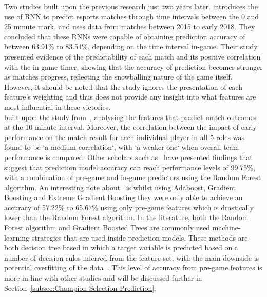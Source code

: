 Two studies built upon the previous research just two years later.
\citet{silva2018continuous} introduces the use of \ac{RNN} to predict esports matches through time intervals between the 0 and 25 minute mark, and uses data from matches between 2015 to early 2018.
They concluded that these \ac{RNN}s were capable of obtaining prediction accuracy of between 63.91\% to 83.54\%, depending on the time interval in-game.
Their study presented evidence of the predictability of each match and its positive correlation with the in-game timer, showing that the accuracy of prediction becomes stronger as matches progress, reflecting the snowballing nature of the game itself.
However, it should be noted that the study ignores the presentation of each feature's weighting and thus does not provide any insight into what features are most influential in these victories. \\

\citet{gaina2018league} built upon the study from~\citet{lin2016league}, analysing the features that predict match outcomes at the 10-minute interval.
Moreover, the correlation between the impact of early performance on the match result for each individual player in all 5 roles was found to be `a medium correlation`, with `a weaker one` when overall team performance is compared.
Other scholars such as~\citet{ani2019victory} have presented findings that suggest that prediction model accuracy can reach performance levels of 99.75\%, with a combination of pre-game and in-game predictors using the Random Forest algorithm.
An interesting note about~\citet{ani2019victory} is whilst using Adaboost, Gradient Boosting and Extreme Gradient Boosting they were only able to achieve an accuracy of 57.22\% to 65.67\% using only pre-game features which is drastically lower than the Random Forest algorithm.
In the literature, both the Random Forest algorithm and Gradient Boosted Trees are commonly used machine-learning strategies that are used inside prediction models.
These methods are both decision tree based in which a target variable is predicted based on a number of decision rules inferred from the feature-set, with the main downside is potential overfitting of the data~\citep{scikitDecisionTrees}.
This level of accuracy from pre-game features is more in line with other studies and will be discussed further in Section~\ref{subsec:Champion Selection Prediction}. \\

